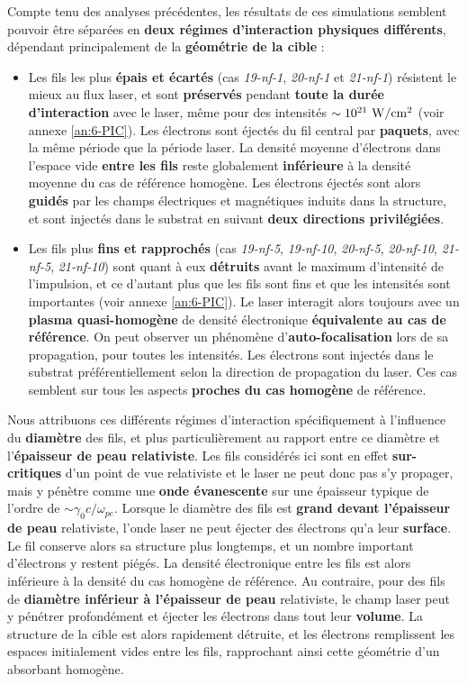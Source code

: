 \begin{refsection}
Compte tenu des analyses précédentes, les résultats de ces simulations semblent pouvoir être séparées en \textbf{deux régimes d'interaction physiques différents}, dépendant principalement de la \textbf{géométrie de la cible} :
\begin{itemize}
    \item Les fils les plus \textbf{épais et écartés} (cas \textit{19-nf-1}, \textit{20-nf-1} et \textit{21-nf-1}) résistent le mieux au flux laser, et sont \textbf{préservés} pendant \textbf{toute la durée d'interaction} avec le laser, même pour des intensités $\sim 10^{21} ~ \rm W/cm^2$ (voir annexe \ref{an:6-PIC}). Les électrons sont éjectés du fil central par \textbf{paquets}, avec la même période que la période laser. La densité moyenne d'électrons dans l'espace vide \textbf{entre les fils} reste globalement \textbf{inférieure} à la densité moyenne du cas de référence homogène. Les électrons éjectés sont alors \textbf{guidés} par les champs électriques et magnétiques induits dans la structure, et sont injectés dans le substrat en suivant \textbf{deux directions privilégiées}.
    
    \item Les fils plus \textbf{fins et rapprochés} (cas \textit{19-nf-5}, \textit{19-nf-10}, \textit{20-nf-5}, \textit{20-nf-10}, \textit{21-nf-5}, \textit{21-nf-10}) sont quant à eux \textbf{détruits} avant le maximum d'intensité de l'impulsion, et ce d'autant plus que les fils sont fins et que les intensités sont importantes (voir annexe \ref{an:6-PIC}). Le laser interagit alors toujours avec un \textbf{plasma quasi-homogène} de densité électronique \textbf{équivalente au cas de référence}. On peut observer un phénomène d'\textbf{auto-focalisation} lors de sa propagation, pour toutes les intensités. Les électrons sont injectés dans le substrat préférentiellement selon la direction de propagation du laser. Ces cas semblent sur tous les aspects \textbf{proches du cas homogène} de référence. 
\end{itemize}


Nous attribuons ces différents régimes d'interaction spécifiquement à l'influence du \textbf{diamètre} des fils, et plus particulièrement au rapport entre ce diamètre et l'\textbf{épaisseur de peau relativiste}. Les fils considérés ici sont en effet \textbf{sur-critiques} d'un point de vue relativiste et le laser ne peut donc pas s'y propager, mais y pénètre comme une \textbf{onde évanescente} sur une épaisseur typique de l'ordre de $\sim \gamma_0 c/\omega_{pe}$. Lorsque le diamètre des fils est \textbf{grand devant l'épaisseur de peau} relativiste, l'onde laser ne peut éjecter des électrons qu'a leur \textbf{surface}. Le fil conserve alors sa structure plus longtemps, et un nombre important d'électrons y restent piégés. La densité électronique entre les fils est alors inférieure à la densité du cas homogène de référence. Au contraire, pour des fils de \textbf{diamètre inférieur à l'épaisseur de peau} relativiste, le champ laser peut y pénétrer profondément et éjecter les électrons dans tout leur \textbf{volume}. La structure de la cible est alors rapidement détruite, et les électrons remplissent les espaces initialement vides entre les fils, rapprochant ainsi cette géométrie d'un absorbant homogène.


\end{refsection}
